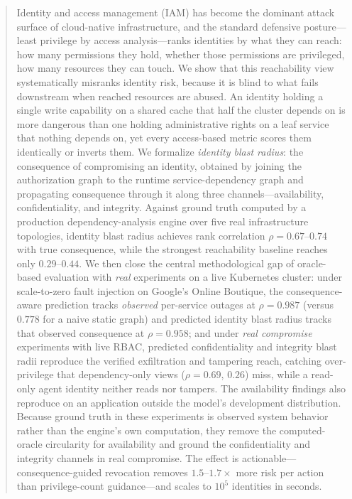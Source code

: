 \documentclass[conference]{IEEEtran}
\begin{document}
\begin{abstract}
Identity and access management (IAM) has become the dominant attack surface of
cloud-native infrastructure, and the standard defensive posture---least privilege
by access analysis---ranks identities by what they can reach: how many permissions
they hold, whether those permissions are privileged, how many resources they can
touch. We show that this reachability view systematically misranks identity risk,
because it is blind to what fails downstream when reached resources are abused. An
identity holding a single write capability on a shared cache that half the cluster
depends on is more dangerous than one holding administrative rights on a leaf
service that nothing depends on, yet every access-based metric scores them
identically or inverts them. We formalize \emph{identity blast radius}: the
consequence of compromising an identity, obtained by joining the authorization
graph to the runtime service-dependency graph and propagating consequence through
it along three channels---availability, confidentiality, and integrity. Against
ground truth computed by a production dependency-analysis engine over five real
infrastructure topologies, identity blast radius achieves rank correlation
$\rho=0.67$--$0.74$ with true consequence, while the strongest reachability
baseline reaches only $0.29$--$0.44$. We then close the central methodological
gap of oracle-based evaluation with \emph{real} experiments on a live Kubernetes cluster: under
scale-to-zero fault injection on Google's Online Boutique, the consequence-aware
prediction tracks \emph{observed} per-service outages at $\rho=0.987$ (versus
$0.778$ for a naive static graph) and predicted identity blast radius tracks that
observed consequence at $\rho=0.958$; and under \emph{real compromise} experiments with
live RBAC, predicted confidentiality and integrity blast radii reproduce the verified
exfiltration and tampering reach, catching over-privilege that dependency-only views
($\rho=0.69$, $0.26$) miss, while a read-only agent identity neither reads nor tampers.
The availability findings also reproduce on an application outside the model's
development distribution. Because ground truth in these experiments is observed system
behavior rather than the engine's own computation, they remove the computed-oracle
circularity for availability and ground the confidentiality and integrity channels in
real compromise. The effect is
actionable---consequence-guided revocation removes $1.5$--$1.7\times$ more risk per
action than privilege-count guidance---and scales to $10^5$ identities in seconds.
\end{abstract}
\end{document}
